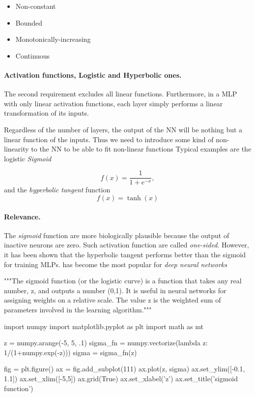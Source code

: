 \documentclass[%
oneside,                 %
final,                   %
10pt]{article}
\begin{document}
\begin{itemize}
  \item Non-constant

  \item Bounded

  \item Monotonically-increasing

  \item Continuous
\end{itemize}

\noindent
\paragraph{Activation functions, Logistic and Hyperbolic ones.}
The second requirement excludes all linear functions. Furthermore, in
a MLP with only linear activation functions, each layer simply
performs a linear transformation of its inputs.

Regardless of the number of layers, the output of the NN will be
nothing but a linear function of the inputs. Thus we need to introduce
some kind of non-linearity to the NN to be able to fit non-linear
functions Typical examples are the logistic \emph{Sigmoid}

\[
 f(x) = \frac{1}{1 + e^{-x}},
\]
and the \emph{hyperbolic tangent} function
\[
 f(x) = \tanh(x)
\]

\paragraph{Relevance.}
The \emph{sigmoid} function are more biologically plausible because the
output of inactive neurons are zero. Such activation function are
called \emph{one-sided}. However, it has been shown that the hyperbolic
tangent performs better than the sigmoid for training MLPs.  has
become the most popular for \emph{deep neural networks}

\bpycod
"""The sigmoid function (or the logistic curve) is a 
function that takes any real number, z, and outputs a number (0,1).
It is useful in neural networks for assigning weights on a relative scale.
The value z is the weighted sum of parameters involved in the learning algorithm."""

import numpy
import matplotlib.pyplot as plt
import math as mt

z = numpy.arange(-5, 5, .1)
sigma_fn = numpy.vectorize(lambda z: 1/(1+numpy.exp(-z)))
sigma = sigma_fn(z)

fig = plt.figure()
ax = fig.add_subplot(111)
ax.plot(z, sigma)
ax.set_ylim([-0.1, 1.1])
ax.set_xlim([-5,5])
ax.grid(True)
ax.set_xlabel('z')
ax.set_title('sigmoid function')
\end{document}
